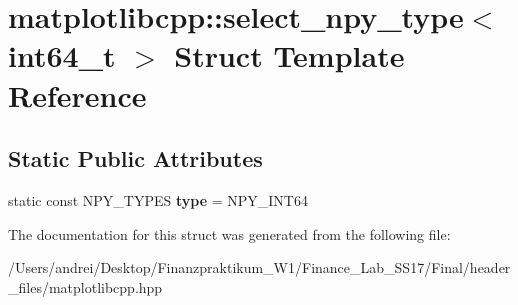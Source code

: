 \hypertarget{structmatplotlibcpp_1_1select__npy__type_3_01int64__t_01_4}{}\section{matplotlibcpp\+:\+:select\+\_\+npy\+\_\+type$<$ int64\+\_\+t $>$ Struct Template Reference}
\label{structmatplotlibcpp_1_1select__npy__type_3_01int64__t_01_4}
\subsection*{Static Public Attributes}
\begin{DoxyCompactItemize}
\item 
\mbox{\label{structmatplotlibcpp_1_1select__npy__type_3_01int64__t_01_4_a0d20ea35e520ad9381aca3c173f3f02d}} 
static const N\+P\+Y\+\_\+\+T\+Y\+P\+ES {\bfseries type} = N\+P\+Y\+\_\+\+I\+N\+T64
\end{DoxyCompactItemize}


The documentation for this struct was generated from the following file\+:\begin{DoxyCompactItemize}
\item 
/\+Users/andrei/\+Desktop/\+Finanzpraktikum\+\_\+\+W1/\+Finance\+\_\+\+Lab\+\_\+\+S\+S17/\+Final/header\+\_\+files/matplotlibcpp.\+hpp\end{DoxyCompactItemize}

